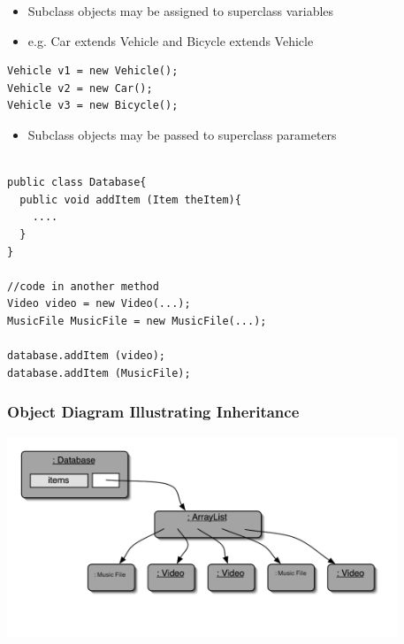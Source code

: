 \documentclass{beamer}
\begin{document}
\begin{frame}[fragile]
\begin{itemize}
\item Subclass objects may be assigned to superclass variables
\item e.g. Car extends Vehicle and Bicycle extends Vehicle
\end{itemize}
\begin{block}{}
\begin{lstlisting}
Vehicle v1 = new Vehicle();
Vehicle v2 = new Car();
Vehicle v3 = new Bicycle();
\end{lstlisting}
\end{block}
\end{frame}

\begin{frame}[fragile]
\begin{itemize}
\item Subclass objects may be passed to superclass parameters
\end{itemize}
\begin{block}{}
\begin{lstlisting} 

public class Database{
  public void addItem (Item theItem){
    ....
  }
}

//code in another method
Video video = new Video(...); 
MusicFile MusicFile = new MusicFile(...);

database.addItem (video); 
database.addItem (MusicFile);
\end{lstlisting}
\end{block}
\end{frame}

\begin{frame}
\frametitle{Object Diagram Illustrating Inheritance}
\begin{center}
\includegraphics[height=6cm, keepaspectratio]{images/inheritance3}
\end{center}
\end{frame}
\end{document}
